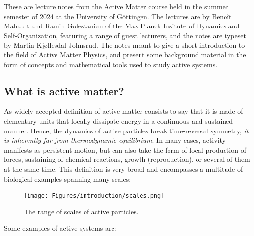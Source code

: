 \label{chapter: introduction}

These are lecture notes from the Active Matter course held in the summer semester of 2024 at the University of Göttingen.
The lectures are by Benoît Mahault and Ramin Golestanian of the Max Planck Insitute of Dynamics and Self-Organization, featuring a range of guest lecturers, and the notes are typeset by Martin Kjøllesdal Johnsrud.
The notes meant to give a short introduction to the field of Active Matter Physics, and present some background material in the form of concepts and mathematical tools used to study active systems.



\subsection{What is active matter?}


As widely accepted definition of active matter consists to say that it is made of elementary units that locally dissipate energy in a continuous and sustained manner. Hence, the dynamics of active particles break time-reversal symmetry, \textit{it is inherently far from thermodynamic equilibrium}. In many cases, activity manifests as persistent motion, but can also take the form of local production of forces, sustaining of chemical reactions, growth (reproduction), or several of them at the same time. This definition is very broad and encompasses a multitude of biological examples spanning many scales:

\begin{figure}[!htb]
    \centering
    \texttt{[image: Figures/introduction/scales.png]}
    \caption{The range of scales of active particles.}
    \label{fig: scales active particles}
\end{figure}


Some examples of active systems are:

